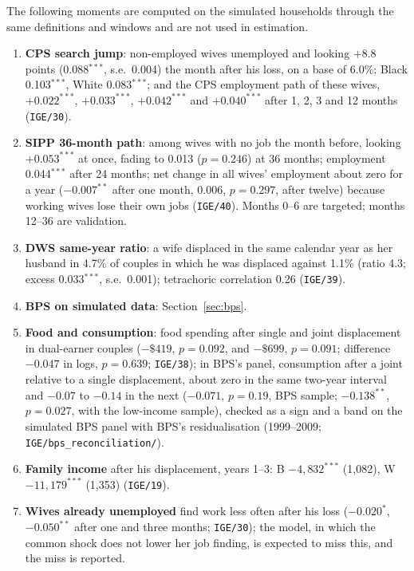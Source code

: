 \documentclass[11pt]{article}
\newcommand{\code}[1]{\texttt{#1}}
\newcommand{\1}{\mathbf{1}}
\begin{document}
The following moments are computed on the simulated households through the same definitions and windows and are not
used in estimation.
\begin{enumerate}
  \item \textbf{CPS search jump}: non-employed wives unemployed and looking $+8.8$ points (0.088$^{***}$, s.e.\ 0.004) the
  month after his loss, on a base of 6.0\%; Black 0.103$^{***}$, White 0.083$^{***}$; and the CPS employment path of
  these wives, $+0.022^{***}$, $+0.033^{***}$, $+0.042^{***}$ and $+0.040^{***}$ after 1, 2, 3 and 12 months
  (\code{IGE/30}).
  \item \textbf{SIPP 36-month path}: among wives with no job the month before, looking $+0.053^{***}$ at once, fading to
  0.013 ($p=0.246$) at 36 months; employment 0.044$^{***}$ after 24 months; net change in all wives' employment about zero
  for a year ($-0.007^{**}$ after one month, 0.006, $p=0.297$, after twelve) because working wives lose their own jobs
  (\code{IGE/40}). Months 0--6 are targeted; months 12--36 are validation.
  \item \textbf{DWS same-year ratio}: a wife displaced in the same calendar year as her husband in 4.7\% of couples in which he
  was displaced against 1.1\% (ratio 4.3; excess 0.033$^{***}$, s.e.\ 0.001); tetrachoric correlation 0.26 (\code{IGE/39}).
  \item \textbf{BPS on simulated data}: Section~\ref{sec:bps}.
  \item \textbf{Food and consumption}: food spending after single and joint displacement in dual-earner couples
  ($-\$419$, $p=0.092$, and $-\$699$, $p=0.091$; difference $-0.047$ in logs, $p=0.639$; \code{IGE/38}); in BPS's panel,
  consumption after a joint relative to a single displacement, about zero in the same two-year interval and $-0.07$ to
  $-0.14$ in the next ($-0.071$, $p=0.19$, BPS sample; $-0.138^{**}$, $p=0.027$, with the low-income sample), checked as a
  sign and a band on the simulated BPS panel with BPS's residualisation (1999--2009; \code{IGE/bps\_reconciliation/}).
  \item \textbf{Family income} after his displacement, years 1--3: B $-4{,}832^{***}$ (1{,}082), W $-11{,}179^{***}$
  (1{,}353) (\code{IGE/19}).
  \item \textbf{Wives already unemployed} find work less often after his loss ($-0.020^{*}$, $-0.050^{**}$ after one and
  three months; \code{IGE/30}); the model, in which the common shock does not lower her job finding, is expected to miss
  this, and the miss is reported.

\end{enumerate}
\end{document}
